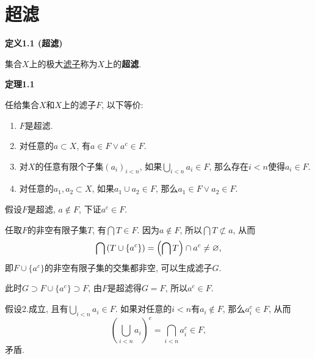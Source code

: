 \documentclass[UTF8]{ctexart}
\begin{document}
\setlength{\abovedisplayskip}{1pt}
\setlength{\belowdisplayskip}{1pt}

\section{超滤}

\hypertarget{sec:定义1.1}{}
\noindent\textbf{定义1.1 (超滤)}

集合$X$上的极大\href{01 滤子#nameddest=sec:定义1.1}{滤子}称为$X$上的\textbf{超滤}.

\vspace{10pt}

\hypertarget{sec:定理1.1}{}
\noindent\textbf{定理1.1}

任给集合$X$和$X$上的滤子$F$, 以下等价:
\vspace{1pt}
\begin{enumerate}
    \item $F$是超滤.
    \vspace{1pt}
    \item 对任意的$a\subset X$, 有$a\in F\lor a^c\in F$.
    \vspace{1pt}
    \item 对$X$的任意有限个子集$(a_i)_{i<n}$,
    如果$\displaystyle\bigcup_{i<n}a_i\in F$, 那么存在$i<n$使得$a_i\in F$.
    \vspace{3pt}
    \item 对任意的$a_1,a_2\subset X$, 如果$a_1\cup a_2\in F$,
    那么$a_1\in F\lor a_2\in F$.
\end{enumerate}



假设$F$是超滤, $a\notin F$, 下证$a^c\in F$.

任取$F$的非空有限子集$T$, 有$\displaystyle\bigcap T\in F$.
因为$a\notin F$, 所以$\displaystyle\bigcap T\not\subset a$, 从而
\[
    \bigcap\,(T\cup\{a^c\})=\left(\bigcap T\right)\cap a^c\neq\varnothing,\\[3pt]
\]
即$F\cup\{a^c\}$的非空有限子集的交集都非空, 可以生成滤子$G$.

此时$G\supset F\cup\{a^c\}\supset F$, 由$F$是超滤得$G=F$, 所以$a^c\in F$.


假设2.成立, 且有$\displaystyle\bigcup_{i<n}a_i\in F$.
如果对任意的$i<n$有$a_i\notin F$, 那么$a_i^c\in F$, 从而
\[
    \left(\bigcup_{i<n}a_i\right)^c=\bigcap_{i<n}a_i^c\in F,
\]
矛盾.
\end{document}
